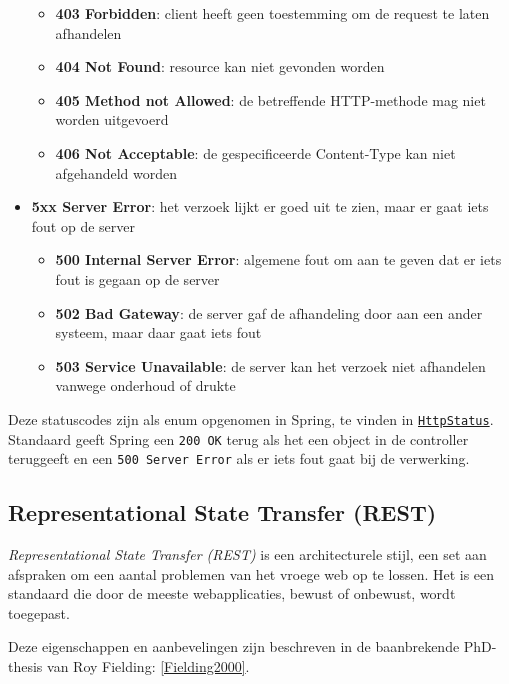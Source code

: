 \begin{itemize}
\begin{itemize}
        \item \textbf{403 Forbidden}: client heeft geen toestemming om de request te laten afhandelen
        \item \textbf{404 Not Found}: resource kan niet gevonden worden
        \item \textbf{405 Method not Allowed}: de betreffende HTTP-methode mag niet worden uitgevoerd
        \item \textbf{406 Not Acceptable}: de gespecificeerde Content-Type kan niet afgehandeld worden
    \end{itemize}
    \item \textbf{5xx Server Error}: het verzoek lijkt er goed uit te zien, maar er gaat iets fout op de server
    \begin{itemize}
        \item \textbf{500 Internal Server Error}: algemene fout om aan te geven dat er iets fout is gegaan op de server
        \item \textbf{502 Bad Gateway}: de server gaf de afhandeling door aan een ander systeem, maar daar gaat iets fout
        \item \textbf{503 Service Unavailable}: de server kan het verzoek niet afhandelen vanwege onderhoud of drukte
    \end{itemize}
\end{itemize}

Deze statuscodes zijn als enum opgenomen in Spring, te vinden in 
\href{https://docs.spring.io/spring-framework/docs/current/javadoc-api/org/springframework/http/HttpStatus.html}{\texttt{HttpStatus}}.
Standaard geeft Spring een \texttt{200 OK} terug als het een object in de controller teruggeeft
en een \texttt{500 Server Error} als er iets fout gaat bij de verwerking.

\subsection{Representational State Transfer (REST)}
\textit{Representational State Transfer (REST)} is een architecturele stijl,
een set aan afspraken om een aantal problemen van het vroege web op te lossen.
Het is een standaard die door de meeste webapplicaties,
bewust of onbewust, wordt toegepast.

Deze eigenschappen en aanbevelingen zijn beschreven in de baanbrekende 
PhD-thesis van Roy Fielding: \ref{Fielding2000}.

